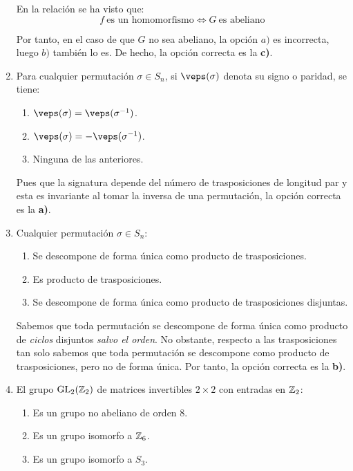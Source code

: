 \documentclass[12pt]{article}
\DeclareMathOperator{\GL}{GL}
\begin{document}
\begin{ejercicio}
\begin{enumerate}
            En la relación se ha visto que:
            \begin{equation*}
                f\ \text{es un homomorfismo}\Longleftrightarrow G\ \text{es abeliano}
            \end{equation*}

            Por tanto, en el caso de que $G$ no sea abeliano, la opción $a)$ es incorrecta, luego $b)$ también lo es. De hecho, la opción correcta es la \textbf{c)}.
            \item Para cualquier permutación $\sigma \in S_n$, si $\veps(\sigma)$ denota su signo o paridad, se tiene:
            \begin{enumerate}
                \item $\veps(\sigma) = \veps(\sigma^{-1})$.
                \item $\veps(\sigma) = -\veps(\sigma^{-1})$.
                \item Ninguna de las anteriores.
            \end{enumerate}

            Pues que la signatura depende del número de trasposiciones de longitud par y esta es invariante al tomar la inversa de una permutación, la opción correcta es la \textbf{a)}.
            \item Cualquier permutación $\sigma \in S_n$:
            \begin{enumerate}
                \item Se descompone de forma única como producto de trasposiciones.
                \item Es producto de trasposiciones.
                \item Se descompone de forma única como producto de trasposiciones disjuntas.
            \end{enumerate}

            Sabemos que toda permutación se descompone de forma única como producto de \emph{ciclos} disjuntos \emph{salvo el orden}. No obstante, respecto a las trasposiciones tan solo sabemos que toda permutación se descompone como producto de trasposiciones, pero no de forma única. Por tanto, la opción correcta es la \textbf{b)}.
            \item El grupo $\GL_2(\bb{Z}_2)$ de matrices invertibles $2 \times 2$ con entradas en $\mathbb{Z}_2$:
            \begin{enumerate}
                \item Es un grupo no abeliano de orden 8.
                \item Es un grupo isomorfo a $\mathbb{Z}_6$.
                \item Es un grupo isomorfo a $S_3$.
            \end{enumerate}


\end{enumerate}
\end{ejercicio}
\end{document}
